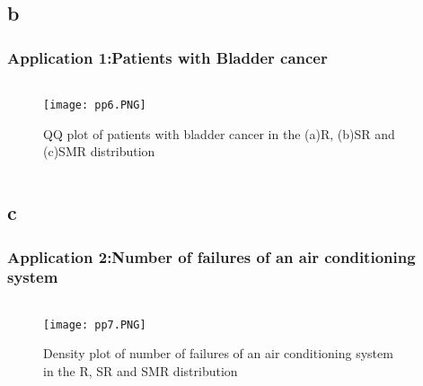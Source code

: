 \documentclass{beamer}
\begin{document}
\subsection{b}
\begin{frame}
\frametitle{Application 1:Patients with Bladder cancer}
\footnotesize
\label{a}
\begin{columns}

\begin{column}{\textwidth}
\begin{figure}[h]
\renewcommand{\theenumi}{1}
\centering
\texttt{[image: pp6.PNG]}
\caption{QQ plot of patients with bladder cancer in the (a)R, (b)SR and (c)SMR distribution }
\label{Fig:2}
\end{figure}
\end{column}
\end{columns}
\end{frame}

\subsection{c}
\begin{frame}
\frametitle{Application 2:Number of failures of an air conditioning system}
\footnotesize
\label{c}
\begin{columns}
\begin{column}{.6\textwidth}
\begin{figure}[h]
\renewcommand{\theenumi}{1}
\centering
\texttt{[image: pp7.PNG]}
\caption{Density plot of number of failures of an air conditioning system in the R, SR and SMR distribution }
\label{Fig:1}
\end{figure}
\end{column}

\begin{column}{.4\textwidth}
\begin{table}[htbp]
\centering
\caption{\tiny Descriptive statistics}
\end{table}
\end{column}
\end{columns}
\end{frame}
\end{document}
